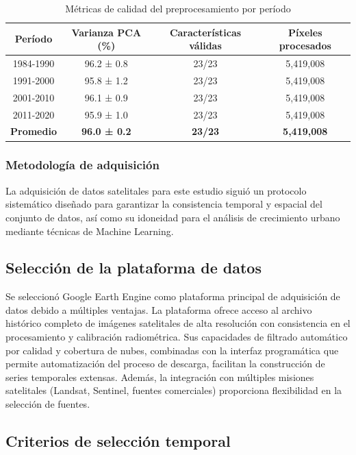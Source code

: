 \begin{table}[h]
\centering
\caption{Métricas de calidad del preprocesamiento por período}
\begin{tabular}{|c|c|c|c|}
\hline
	\textbf{Período} & \textbf{Varianza PCA (\%)} & \textbf{Características válidas} & \textbf{Píxeles procesados} \\
\hline
1984-1990 & 96.2 ± 0.8 & 23/23 & 5,419,008 \\
1991-2000 & 95.8 ± 1.2 & 23/23 & 5,419,008 \\
2001-2010 & 96.1 ± 0.9 & 23/23 & 5,419,008 \\
2011-2020 & 95.9 ± 1.0 & 23/23 & 5,419,008 \\
\hline
	\textbf{Promedio} & \textbf{96.0 ± 0.2} & \textbf{23/23} & \textbf{5,419,008} \\
\hline
\end{tabular}
\label{tab:preprocessing_quality}
\end{table}

\subsubsection{Metodología de adquisición}

La adquisición de datos satelitales para este estudio siguió un protocolo sistemático diseñado para garantizar la consistencia temporal y espacial del conjunto de datos, así como su idoneidad para el análisis de crecimiento urbano mediante técnicas de Machine Learning.

\subsection{Selección de la plataforma de datos}

Se seleccionó Google Earth Engine como plataforma principal de adquisición de datos debido a múltiples ventajas. La plataforma ofrece acceso al archivo histórico completo de imágenes satelitales de alta resolución con consistencia en el procesamiento y calibración radiométrica. Sus capacidades de filtrado automático por calidad y cobertura de nubes, combinadas con la interfaz programática que permite automatización del proceso de descarga, facilitan la construcción de series temporales extensas. Además, la integración con múltiples misiones satelitales (Landsat, Sentinel, fuentes comerciales) proporciona flexibilidad en la selección de fuentes.

\subsection{Criterios de selección temporal}

